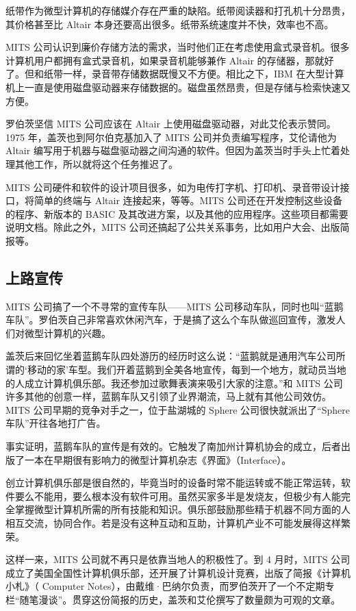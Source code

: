 \documentclass[12pt,UTF8]{ctexbook}
\begin{document}
纸带作为微型计算机的存储媒介存在严重的缺陷。纸带阅读器和打孔机十分昂贵，其价格甚至比 Altair 本身还要高出很多。纸带系统速度并不快，效率也不高。

MITS 公司认识到廉价存储方法的需求，当时他们正在考虑使用盒式录音机。很多计算机用户都拥有盒式录音机，如果录音机能够兼作 Altair 的存储器，那就好了。但和纸带一样，录音带存储数据既慢又不方便。相比之下，IBM 在大型计算机上一直是使用磁盘驱动器来存储数据的。磁盘虽然昂贵，但是存储与检索快速又方便。

罗伯茨坚信 MITS 公司应该在 Altair 上使用磁盘驱动器，对此艾伦表示赞同。1975 年，盖茨也到阿尔伯克基加入了 MITS 公司并负责编写程序，艾伦请他为 Altair 编写用于机器与磁盘驱动器之间沟通的软件。但因为盖茨当时手头上忙着处理其他工作，所以就将这个任务推迟了。

MITS 公司硬件和软件的设计项目很多，如为电传打字机、打印机、录音带设计接口，将简单的终端与 Altair 连接起来，等等。MITS 公司还在开发控制这些设备的程序、新版本的 BASIC 及其改进方案，以及其他的应用程序。这些项目都需要说明文档。除此之外，MITS 公司还搞起了公共关系事务，比如用户大会、出版简报等。





\subsection{上路宣传}


MITS 公司搞了一个不寻常的宣传车队——MITS 公司移动车队，同时也叫“蓝鹅车队”。罗伯茨自己非常喜欢休闲汽车，于是搞了这么个车队做巡回宣传，激发人们对微型计算机的兴趣。

盖茨后来回忆坐着蓝鹅车队四处游历的经历时这么说：“蓝鹅就是通用汽车公司所谓的‘移动的家’车型。我们开着蓝鹅到全美各地宣传，每到一个地方，就动员当地的人成立计算机俱乐部。我还参加过歌舞表演来吸引大家的注意。”和 MITS 公司许多其他的创意一样，蓝鹅车队又引领了业界潮流，马上就有其他公司效仿。MITS 公司早期的竞争对手之一，位于盐湖城的 Sphere 公司很快就派出了“Sphere 车队”开往各地打广告。

事实证明，蓝鹅车队的宣传是有效的。它触发了南加州计算机协会的成立，后者出版了一本在早期很有影响力的微型计算机杂志《界面》（Interface）。

创立计算机俱乐部是很自然的，毕竟当时的设备时常不能运转或不能正常运转，软件要么不能用，要么根本没有软件可用。虽然买家多半是发烧友，但极少有人能完全掌握微型计算机所需的所有技能和知识。俱乐部鼓励那些精于机器不同方面的人相互交流，协同合作。若是没有这种互动和互助，计算机产业不可能发展得这样繁荣。

这样一来，MITS 公司就不再只是依靠当地人的积极性了。到 4 月时，MITS 公司成立了美国全国性计算机俱乐部，还开展了计算机设计竞赛，出版了简报《计算机小札》（ Computer Notes），由戴维·巴纳尔负责，而罗伯茨开了一个不定期专栏“随笔漫谈”。贯穿这份简报的历史，盖茨和艾伦撰写了数量颇为可观的文章。
\end{document}
